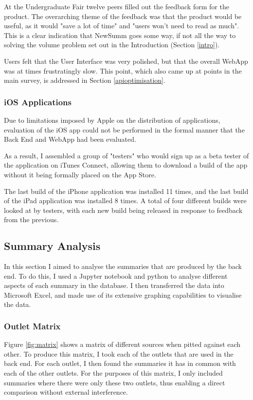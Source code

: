 \documentclass[12pt]{article}
\begin{document}
At the Undergraduate Fair twelve peers filled out the feedback form for the product. The overarching theme of the feedback was that the product would be useful, as it would "save a lot of time" and "users won't need to read as much". This is a clear indication that NewSumm goes some way, if not all the way to solving the volume problem set out in the Introduction (Section \ref{intro}).

Users felt that the User Interface was very polished, but that the overall WebApp was at times frustratingly slow. This point, which also came up at points in the main survey, is addressed in Section \ref{apioptimisation}.

\subsubsection{iOS Applications}

Due to limitations imposed by Apple on the distribution of applications, evaluation of the iOS app could not be performed in the formal manner that the Back End and WebApp had been evaluated. 

As a result, I assembled a group of "testers" who would sign up as a beta tester of the application on iTunes Connect, allowing them to download a build of the app without it being formally placed on the App Store.

The last build of the iPhone application was installed 11 times, and the last build of the iPad application was installed 8 times. A total of four different builds were looked at by testers, with each new build being released in response to feedback from the previous.   

\subsection{Summary Analysis}

In this section I aimed to analyse the summaries that are produced by the back end. To do this, I used a Jupyter notebook and python to analyse different aspects of each summary in the database. I then transferred the data into Microsoft Excel, and made use of its extensive graphing capabilities to visualise the data.

\subsubsection{Outlet Matrix}

Figure \ref{fig:matrix} shows a matrix of different sources when pitted against each other. To produce this matrix, I took each of the outlets that are used in the back end. For each outlet, I then found the summaries it has in common with each of the other outlets. For the purposes of this matrix, I only included summaries where there were only these two outlets, thus enabling a direct comparison without external interference.
\end{document}
